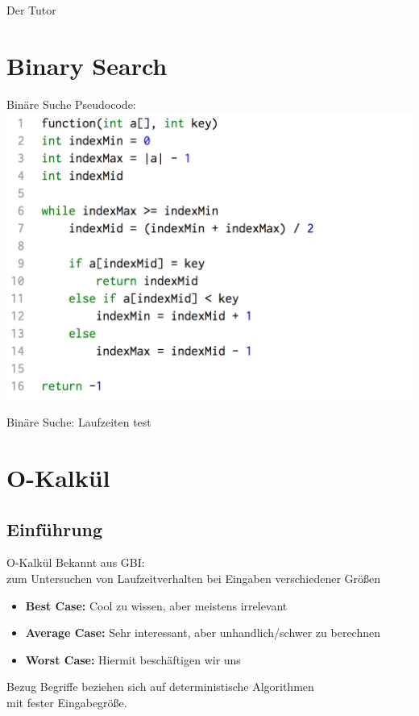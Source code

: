 \documentclass[18pt]{beamer}
\begin{document}
\begin{frame}{Der Tutor}
\section{Binary Search}
	\begin{frame}{Binäre Suche}
		Pseudocode: \\
		\includegraphics[align=center, scale=0.2]{pics/pseudocode03.png}			
	\end{frame}
	\begin{frame}{Binäre Suche: Laufzeiten}
		test
	\end{frame}	

\section{O-Kalkül}
	\subsection{Einführung}
	\begin{frame}{O-Kalkül}
		Bekannt aus GBI: \\
		zum Untersuchen von Laufzeitverhalten bei Eingaben verschiedener Größen
		\begin{itemize}
			\item \textbf{Best Case:} Cool zu wissen, aber meistens irrelevant
			\item \textbf{Average Case:} Sehr interessant, aber unhandlich/schwer zu berechnen
			\item \textbf{Worst Case:} Hiermit beschäftigen wir uns
		\end{itemize}
		\begin{block}{Bezug}
			Begriffe beziehen sich auf deterministische Algorithmen \\mit fester Eingabegröße.
		\end{block}
	\end{frame}



\end{frame}
\end{document}
